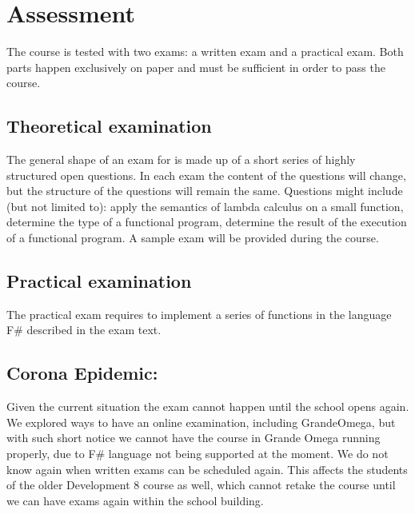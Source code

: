 \section{Assessment}
The course is tested with two exams: a written exam and a practical exam. Both parts happen exclusively on paper and must be sufficient in order to pass the course.

\subsection{Theoretical examination \modulecode}
The general shape of an exam for \texttt{\modulecode} is made up of a short series of highly structured open questions.
In each exam the content of the questions will change, but the structure of the questions will remain the same. Questions might include (but not limited to): apply the semantics of lambda calculus on a small function, determine the type of a functional program, determine the result of the execution of a functional program. A sample exam will be provided during the course.

\subsection{Practical examination \modulecode}
The practical exam requires to implement a series of functions in the language F\# described in the exam text.

\subsection{Corona Epidemic:}
Given the current situation the exam cannot happen until the school opens again. We explored ways to have an online examination, including GrandeOmega, but with such short notice we cannot have the course in Grande Omega running properly, due to F\# language not being supported at the moment. We do not know again when written exams can be scheduled again. This affects the students of the older Development 8 course as well, which cannot retake the course until we can have exams again within the school building.
